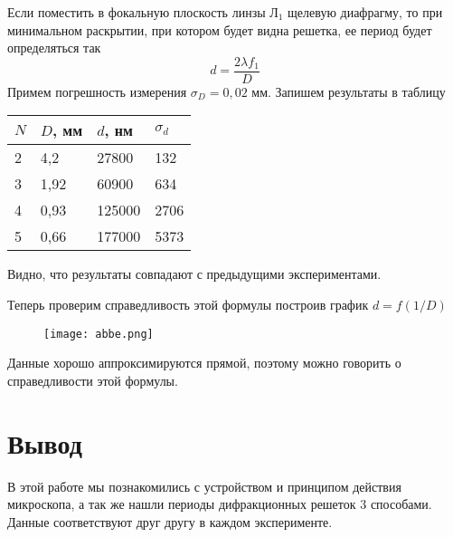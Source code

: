 	Если поместить в фокальную плоскость линзы Л$_1$ щелевую диафрагму, то при минимальном раскрытии, при котором будет видна решетка, ее период будет определяться так
	\[
		d = \frac{2\lambda f_1}{D}
	\]
	Примем погрешность измерения $\sigma_D = 0,02$ мм.
	Запишем результаты в таблицу
	\begin{table}[H]
		\centering
		\begin{tabular}{|l|l|l|l|}
			\hline
			$N$ & $D$, мм & $d$, нм & $\sigma_d$ \\ \hline
			2   & 4,2     & 27800   & 132        \\ \hline
			3   & 1,92    & 60900   & 634        \\ \hline
			4   & 0,93    & 125000  & 2706       \\ \hline
			5   & 0,66    & 177000  & 5373       \\ \hline
		\end{tabular}
	\end{table}
	Видно, что результаты совпадают с предыдущими экспериментами.
	
	Теперь проверим справедливость этой формулы построив график $d = f(1/D)$
	\begin{figure}[H]
		\centering
		\texttt{[image: abbe.png]}
	\end{figure}

	Данные хорошо аппроксимируются прямой, поэтому можно говорить о справедливости этой формулы.
	
	\section{Вывод}
	В этой работе мы познакомились с устройством и принципом действия микроскопа, а так же нашли периоды дифракционных решеток 3 способами. Данные соответствуют друг другу в каждом эксперименте.















